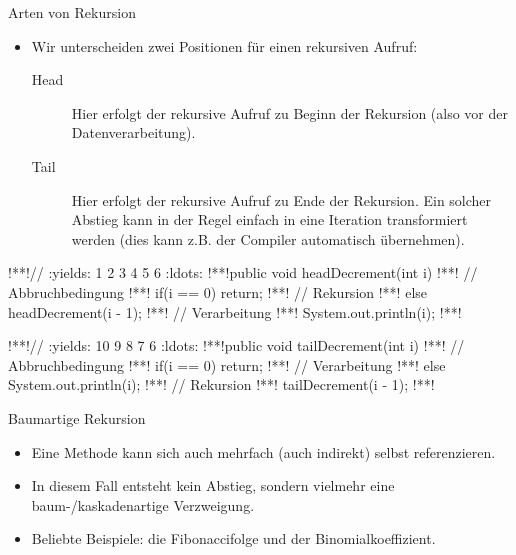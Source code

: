 \begin{frame}[fragile]{Arten von Rekursion}
    \begin{itemize}[<+(1)->]
        \widei
        \item Wir unterscheiden zwei Positionen für einen rekursiven Aufruf: \begin{description}
            \item[Head] Hier erfolgt der rekursive Aufruf zu Beginn der Rekursion (also vor der Datenverarbeitung).
            \item[Tail] Hier erfolgt der rekursive Aufruf zu Ende der Rekursion.\pause{} Ein solcher Abstieg kann in der Regel einfach in eine Iteration transformiert werden (dies kann z.B. der Compiler automatisch übernehmen).
        \end{description}
    \end{itemize}
\begin{center}\scriptsize%
\begin{minipage}{.45\linewidth}
\begin{plainjava}
!**!// :yields: 1 2 3 4 5 6 :ldots:
!**!public void headDecrement(int i){
!**!    // Abbruchbedingung
!**!    if(i == 0) return;
!**!    // Rekursion
!**!    else headDecrement(i - 1);
!**!    // Verarbeitung
!**!    System.out.println(i);
!**!}
\end{plainjava}
\end{minipage}\qquad\begin{minipage}{.45\linewidth}
\begin{plainjava}
!**!// :yields: 10 9 8 7 6 :ldots:
!**!public void tailDecrement(int i){
!**!    // Abbruchbedingung
!**!    if(i == 0) return;
!**!    // Verarbeitung
!**!    else System.out.println(i);
!**!    // Rekursion
!**!    tailDecrement(i - 1);
!**!}
\end{plainjava}
\end{minipage}
\end{center}
\end{frame}

\begin{frame}{Baumartige Rekursion}
    \begin{itemize}[<+(1)->]
        \widei
        \item Eine Methode kann sich auch mehrfach (auch indirekt) selbst referenzieren.
        \item In diesem Fall entsteht kein  Abstieg,\pause{} sondern vielmehr eine baum-/kaskadenartige Verzweigung.
        \item Beliebte Beispiele: die Fibonaccifolge und der Binomialkoeffizient.
    \end{itemize}
    \vfill\null
\end{frame}


